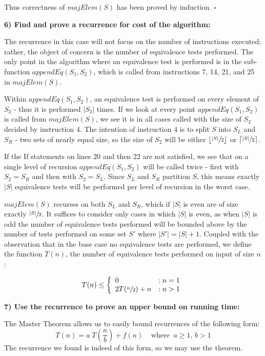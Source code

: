 \documentclass{article}
\begin{document}
Thus correctness of $majElem(S)$ has been proved by induction. $\square$ 

\textbf{6) Find and prove a recurrence for cost of the algorithm:}

The recurrence in this case will not focus on the number of instructions
executed; rather, the object of concern is the number of equivalence tests
performed. The only point in the algorithm where an equivalence test is
performed is in the sub-function $appendEq(S_1,S_2)$, which is called from
instructions 7, 14, 21, and 25 in $majElem(S)$.

Within $appendEq(S_1,S_2)$, an equivalence test is performed on every element of
$S_2$ - thus it is performed $|S_2|$ times. If we look at every point
$appendEq(S_1,S_2)$ is called from $majElem(S)$, we see it is in all cases
called with the size of $S_2$ decided by instruction 4. The intention of
instruction 4 is to split $S$ into $S_L$ and $S_R$ - two sets of nearly equal
size, so the size of $S_2$ will be either $\lfloor \sfrac{|S|}{2} \rfloor$ or
$\lceil \sfrac{|S|}{2} \rceil$.

If the If statements on lines 20 and then 22 are not satisfied, we see that on a
single level of recursion $appendEq(S_1,S_2)$ will be called twice - first with
$S_2=S_R$ and then with $S_2=S_L$. Since $S_L$ and $S_R$ partition $S$, this
means exactly $|S|$ equivalence tests will be performed per level of recursion
in the worst case.

$majElem(S)$ recurses on both $S_L$ and $S_R$, which if $|S|$ is even are of
size exactly $\sfrac{|S|}{2}$. It suffices to consider only cases in which
$|S|$ is even, as when $|S|$ is odd the number of equivalence tests performed
will be bounded above by the number of tests performed on some set $S'$ where
$|S'| = |S|+1$. Coupled with the observation that in the base case no
equivalence tests are performed, we define the function $T(n)$, the number of
equivalence tests performed on input of size $n$:

\begin{displaymath}
T(n) \leq \left\{
	\begin{array}{lr}
	0 & : n=1 \\
	2T(\sfrac{n}{2}) + n & : n>1
	\end{array}
	\right.
\end{displaymath} 

\textbf{7) Use the recurrence to prove an upper bound on running time:}

The Master Theorem allows us to easily bound recurrences of the following form:
\begin{equation*}
T(n) = a \; T\!\left(\frac{n}{b}\right) + f(n)  \;\;\;\; \mbox{where} \;\; a
\geq 1 \mbox{, } b > 1
\end{equation*}
The recurrence we found is indeed of this form, so we may use the theorem.
\end{document}
